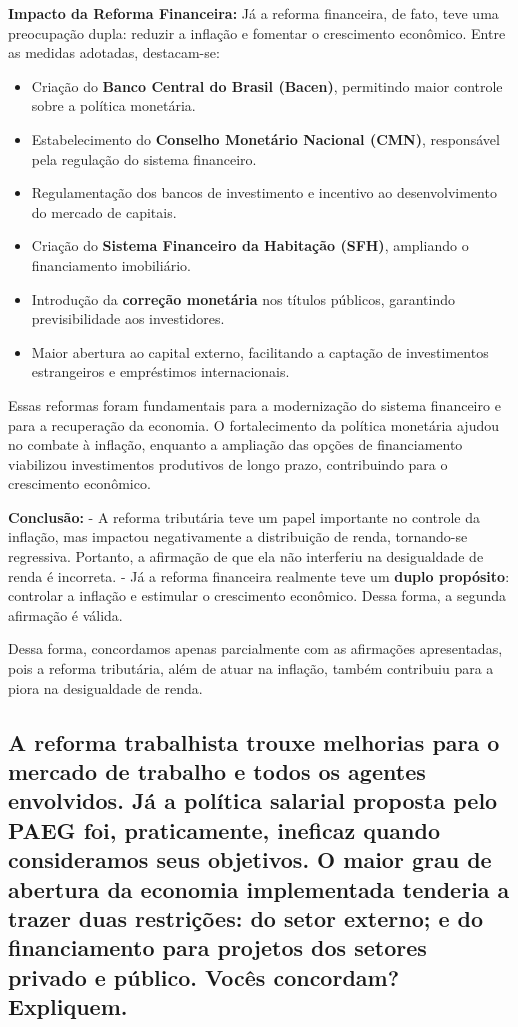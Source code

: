 \documentclass[a4paper,12pt]{article}[abntex2]
\begin{document}
\noindent \textbf{Impacto da Reforma Financeira:}  
Já a reforma financeira, de fato, teve uma preocupação dupla: reduzir a inflação e fomentar o crescimento econômico. Entre as medidas adotadas, destacam-se:
\begin{itemize}
    \item Criação do \textbf{Banco Central do Brasil (Bacen)}, permitindo maior controle sobre a política monetária.
    \item Estabelecimento do \textbf{Conselho Monetário Nacional (CMN)}, responsável pela regulação do sistema financeiro.
    \item Regulamentação dos bancos de investimento e incentivo ao desenvolvimento do mercado de capitais.
    \item Criação do \textbf{Sistema Financeiro da Habitação (SFH)}, ampliando o financiamento imobiliário.
    \item Introdução da \textbf{correção monetária} nos títulos públicos, garantindo previsibilidade aos investidores.
    \item Maior abertura ao capital externo, facilitando a captação de investimentos estrangeiros e empréstimos internacionais.
\end{itemize}

Essas reformas foram fundamentais para a modernização do sistema financeiro e para a recuperação da economia. O fortalecimento da política monetária ajudou no combate à inflação, enquanto a ampliação das opções de financiamento viabilizou investimentos produtivos de longo prazo, contribuindo para o crescimento econômico.

\noindent \textbf{Conclusão:}  
- A reforma tributária teve um papel importante no controle da inflação, mas impactou negativamente a distribuição de renda, tornando-se regressiva. Portanto, a afirmação de que ela não interferiu na desigualdade de renda é incorreta.
- Já a reforma financeira realmente teve um \textbf{duplo propósito}: controlar a inflação e estimular o crescimento econômico. Dessa forma, a segunda afirmação é válida.

Dessa forma, concordamos apenas parcialmente com as afirmações apresentadas, pois a reforma tributária, além de atuar na inflação, também contribuiu para a piora na desigualdade de renda.

\subsection{\textbf{A reforma trabalhista trouxe melhorias para o mercado de trabalho e todos os agentes envolvidos. Já a política salarial proposta pelo PAEG foi, praticamente, ineficaz quando consideramos seus objetivos. O maior grau de abertura da economia implementada tenderia a trazer duas restrições: do setor externo; e do financiamento para projetos dos setores privado e público. Vocês concordam? Expliquem.}}
\end{document}
